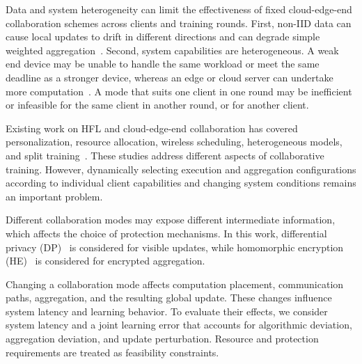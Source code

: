 \documentclass[5p,times]{elsarticle}
\theoremstyle{plain}
\theoremstyle{definition}
\theoremstyle{remark}
\begin{document}
Data and system heterogeneity can limit the effectiveness of fixed cloud-edge-end collaboration schemes across clients and training rounds. First, non-IID data can cause
local updates to drift in different directions and can degrade simple weighted
aggregation~\cite{fedavgm,fedprox,scaffold}.
Second, system capabilities are heterogeneous. A weak end device may be unable
to handle the same workload or meet the same deadline as a stronger device,
whereas an edge or cloud server can undertake more computation~\cite{wang2019adaptivefl}.
A mode that suits one client in one round may be inefficient or infeasible
for the same client in another round, or for another client.

Existing work on HFL and cloud-edge-end collaboration has covered personalization,
resource allocation, wireless scheduling, heterogeneous models, and split
training~\cite{Personalizedhfl,JSJX202502007,dinh2021wirelessfl,BSBODP,mazloomi2025multiserver,SFETEC}.
These studies address different aspects of collaborative training. However, dynamically selecting execution and aggregation configurations according to individual client capabilities and changing system conditions remains an important problem.

Different collaboration modes may expose different intermediate information, which affects the choice of protection mechanisms. In this work, differential privacy (DP)~\cite{dwork2006calibrating,mironov2017rdp} is considered for visible updates, while homomorphic encryption (HE)~\cite{cheon2017ckks} is considered for encrypted aggregation.

Changing a collaboration mode affects computation placement, communication paths, aggregation, and the resulting global update. These changes influence system latency and learning behavior. To evaluate their effects, we consider system latency and a joint learning error that accounts for algorithmic deviation, aggregation deviation, and update perturbation. Resource and protection requirements are treated as feasibility constraints.
\end{document}
